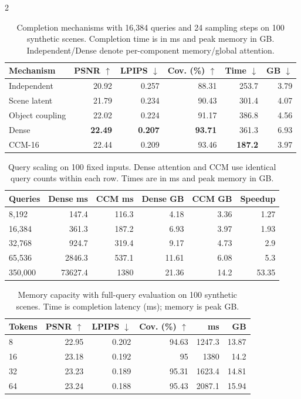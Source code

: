 \begin{multicols}{2}
\begin{table}[H]
\centering\small
\setlength{\tabcolsep}{3pt}
\caption{Completion mechanisms with 16,384 queries and 24 sampling steps on 100 synthetic scenes. Completion time is in ms and peak memory in GB. Independent/Dense denote per-component memory/global attention.}
\label{tab:dense-attention}
\begin{tabular}{@{}lrrrrr@{}}
\toprule
Mechanism & PSNR $\uparrow$ & LPIPS $\downarrow$ & Cov. (\%) $\uparrow$ & Time $\downarrow$ & GB $\downarrow$ \\
\midrule
Independent & 20.92 & 0.257 & 88.31 & 253.7 & 3.79 \\
Scene latent & 21.79 & 0.234 & 90.43 & 301.4 & 4.07 \\
Object coupling & 22.02 & 0.224 & 91.17 & 386.8 & 4.56 \\
Dense & \textbf{22.49} & \textbf{0.207} & \textbf{93.71} & 361.3 & 6.93 \\
CCM-16 & 22.44 & 0.209 & 93.46 & \textbf{187.2} & 3.97 \\
\bottomrule
\end{tabular}
\end{table}

\begin{table}[H]
\centering\small
\setlength{\tabcolsep}{3pt}
\caption{Query scaling on 100 fixed inputs. Dense attention and CCM use identical query counts within each row. Times are in ms and peak memory in GB.}
\label{tab:attention-scaling}
\begin{tabular}{@{}lrrrrr@{}}
\toprule
Queries & Dense ms & CCM ms & Dense GB & CCM GB & Speedup \\
\midrule
8,192 & 147.4 & 116.3 & 4.18 & 3.36 & 1.27 \\
16,384 & 361.3 & 187.2 & 6.93 & 3.97 & 1.93 \\
32,768 & 924.7 & 319.4 & 9.17 & 4.73 & 2.9 \\
65,536 & 2846.3 & 537.1 & 11.61 & 6.08 & 5.3 \\
350,000 & 73627.4 & 1380 & 21.36 & 14.2 & 53.35 \\
\bottomrule
\end{tabular}
\end{table}

\begin{table}[H]
\centering\small
\setlength{\tabcolsep}{4pt}
\caption{Memory capacity with full-query evaluation on 100 synthetic scenes. Time is completion latency (ms); memory is peak GB.}
\label{tab:memory-capacity}
\begin{tabular}{@{}lrrrrr@{}}
\toprule
Tokens & PSNR $\uparrow$ & LPIPS $\downarrow$ & Cov. (\%) $\uparrow$ & ms & GB \\
\midrule
8 & 22.95 & 0.202 & 94.63 & 1247.3 & 13.87 \\
16 & 23.18 & 0.192 & 95 & 1380 & 14.2 \\
32 & 23.23 & 0.189 & 95.31 & 1623.4 & 14.81 \\
64 & 23.24 & 0.188 & 95.43 & 2087.1 & 15.94 \\
\bottomrule
\end{tabular}
\end{table}


\end{multicols}
